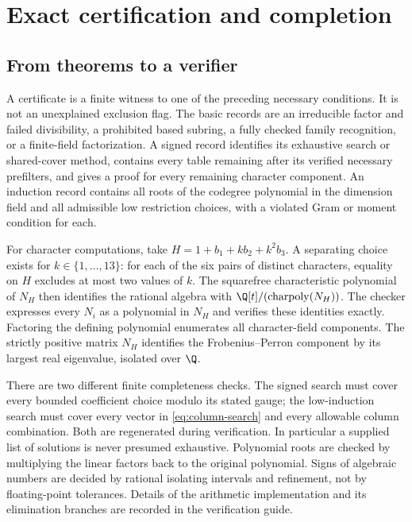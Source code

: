 \section{Exact certification and completion}\label{sec:finite-certification}
\subsection{From theorems to a verifier}
A certificate is a finite witness to one of the preceding necessary
conditions. It is not an unexplained exclusion flag. The basic records are
an irreducible factor and failed divisibility, a prohibited based subring,
a fully checked family recognition, or a finite-field factorization. A
signed record identifies its exhaustive search or shared-cover method,
contains every table remaining after its verified necessary prefilters,
and gives a proof for every remaining character component. An induction record contains all roots of
the codegree polynomial in the dimension field and all admissible low
restriction choices, with a violated Gram or moment condition for each.

For character computations, take
$H=1+b_1+kb_2+k^2b_3$. A separating choice exists for $k\in\{1,\ldots,13\}$:
for each of the six pairs of distinct characters, equality on $H$ excludes
at most two values of $k$. The squarefree characteristic polynomial of
$N_H$ then identifies the rational algebra with
$\Q[t]/(\operatorname{charpoly}(N_H))$. The checker expresses every $N_i$
as a polynomial in $N_H$ and verifies these identities exactly. Factoring
the defining polynomial enumerates all character-field components. The
strictly positive matrix $N_H$ identifies the Frobenius--Perron component
by its largest real eigenvalue, isolated over $\Q$.

There are two different finite completeness checks. The signed search
must cover every bounded coefficient choice modulo its stated gauge; the
low-induction search must cover every vector in
\eqref{eq:column-search} and every allowable column combination. Both are
regenerated during verification. In particular a supplied list of solutions
is never presumed exhaustive. Polynomial roots are checked by multiplying
the linear factors back to the original polynomial. Signs of algebraic
numbers are decided by rational isolating intervals and refinement, not by
floating-point tolerances. Details of the arithmetic implementation and
its elimination branches are recorded in the verification guide.

